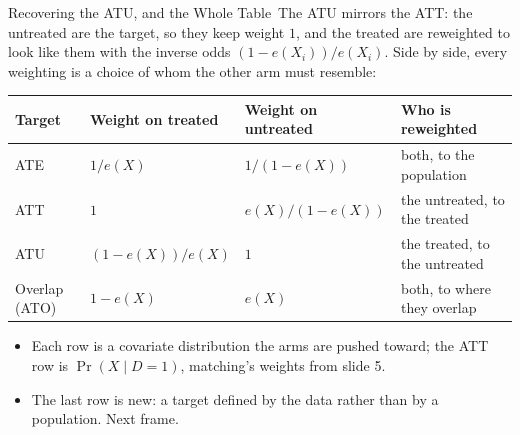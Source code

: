 \documentclass[aspectratio=169,11pt,xcolor=dvipsnames]{beamer}
\newcommand{\core}{\,\raisebox{0.6pt}{\textcolor{corestar}{$\bigstar$}}}
\begin{document}
\begin{frame}{Recovering the ATU, and the Whole Table\core}
The ATU mirrors the ATT: the untreated are the target, so they keep weight
$1$, and the treated are reweighted to look like them with the inverse odds
$(1-e(X_i))/e(X_i)$. Side by side, every weighting is a choice of whom the
other arm must resemble:
\begin{center}\small
\renewcommand{\arraystretch}{1.1}
\begin{tabular}{llll}
\toprule
Target & Weight on treated & Weight on untreated & Who is reweighted \\
\midrule
ATE & $1/e(X)$ & $1/(1-e(X))$ & both, to the population \\
ATT & $1$ & $e(X)/(1-e(X))$ & the untreated, to the treated \\
ATU & $(1-e(X))/e(X)$ & $1$ & the treated, to the untreated \\
Overlap (ATO) & $1-e(X)$ & $e(X)$ & both, to where they overlap \\
\bottomrule
\end{tabular}
\end{center}
\begin{itemize}\itemsep2pt
  \item Each row is a covariate distribution the arms are pushed toward; the
        ATT row is $\Pr(X\mid D = 1)$, matching's weights from slide 5.
  \item The last row is new: a target defined by the data rather than by a
        population. Next frame.
\end{itemize}
\end{frame}
\end{document}
